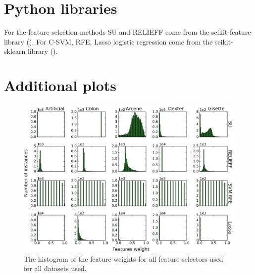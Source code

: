 \documentclass[twoside,11pt]{article}
\begin{document}
\vskip 0.2in


\newpage

\appendix
\label{appendix}
\section{Python libraries}
\label{apd:libraries}
For the feature selection methods SU and RELIEFF come from the scikit-feature library (\cite{Li-etal16}).
For C-SVM, RFE, Lasso logistic regression come from the scikit-sklearn library (\cite{scikit-learn}).
\section{Additional plots}
\label{apd:plots}
\begin{figure}[h!]
  \centering
    \includegraphics[width=\textwidth]{images/feature_weights_hist.png}
  \caption{The histogram of the feature weights for all feature selectors used for all datasets used.}
  \label{fig:feature_weights_hist}
\end{figure}
\end{document}
